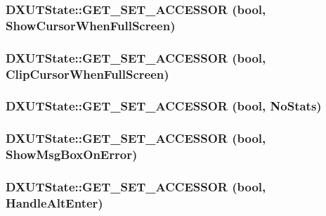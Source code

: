 \label{class_d_x_u_t_state_a467c802afbcd8e51a8ccf569107eed64}
\hypertarget{class_d_x_u_t_state_a7837099484fc89dcfbe7e946ddfa110b}{
\subsubsection[{GET\_\-SET\_\-ACCESSOR}]{\setlength{\rightskip}{0pt plus 5cm}DXUTState::GET\_\-SET\_\-ACCESSOR (bool, \/  ShowCursorWhenFullScreen)}}
\label{class_d_x_u_t_state_a7837099484fc89dcfbe7e946ddfa110b}
\hypertarget{class_d_x_u_t_state_ae283ff2e049bdfeea771c4455f22cd45}{
\subsubsection[{GET\_\-SET\_\-ACCESSOR}]{\setlength{\rightskip}{0pt plus 5cm}DXUTState::GET\_\-SET\_\-ACCESSOR (bool, \/  ClipCursorWhenFullScreen)}}
\label{class_d_x_u_t_state_ae283ff2e049bdfeea771c4455f22cd45}
\hypertarget{class_d_x_u_t_state_a1b5b19c4a6f615466138fe64650e5327}{
\subsubsection[{GET\_\-SET\_\-ACCESSOR}]{\setlength{\rightskip}{0pt plus 5cm}DXUTState::GET\_\-SET\_\-ACCESSOR (bool, \/  NoStats)}}
\label{class_d_x_u_t_state_a1b5b19c4a6f615466138fe64650e5327}
\hypertarget{class_d_x_u_t_state_a44b27d2dd1faa77b891d872072cf1c74}{
\subsubsection[{GET\_\-SET\_\-ACCESSOR}]{\setlength{\rightskip}{0pt plus 5cm}DXUTState::GET\_\-SET\_\-ACCESSOR (bool, \/  ShowMsgBoxOnError)}}
\label{class_d_x_u_t_state_a44b27d2dd1faa77b891d872072cf1c74}
\hypertarget{class_d_x_u_t_state_a981afeeb5288f87cb108aea494aeb8b1}{
\subsubsection[{GET\_\-SET\_\-ACCESSOR}]{\setlength{\rightskip}{0pt plus 5cm}DXUTState::GET\_\-SET\_\-ACCESSOR (bool, \/  HandleAltEnter)}}
